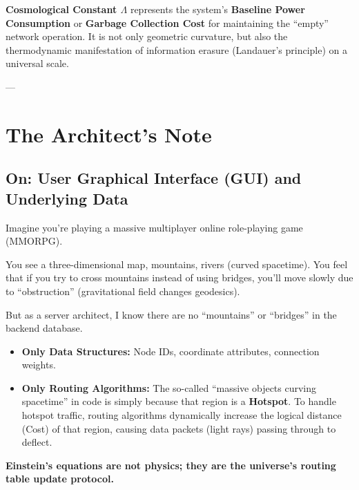 \textbf{Cosmological Constant $\Lambda$} represents the system's \textbf{Baseline Power Consumption} or \textbf{Garbage Collection Cost} for maintaining the ``empty'' network operation. It is not only geometric curvature, but also the thermodynamic manifestation of information erasure (Landauer's principle) on a universal scale.

---

\section{The Architect's Note}

\subsection{On: User Graphical Interface (GUI) and Underlying Data}

Imagine you're playing a massive multiplayer online role-playing game (MMORPG).

You see a three-dimensional map, mountains, rivers (curved spacetime). You feel that if you try to cross mountains instead of using bridges, you'll move slowly due to ``obstruction'' (gravitational field changes geodesics).

But as a server architect, I know there are no ``mountains'' or ``bridges'' in the backend database.

\begin{itemize}
\item \textbf{Only Data Structures:} Node IDs, coordinate attributes, connection weights.

\item \textbf{Only Routing Algorithms:} The so-called ``massive objects curving spacetime'' in code is simply because that region is a \textbf{Hotspot}. To handle hotspot traffic, routing algorithms dynamically increase the logical distance (Cost) of that region, causing data packets (light rays) passing through to deflect.
\end{itemize}

\textbf{Einstein's equations are not physics; they are the universe's routing table update protocol.}

